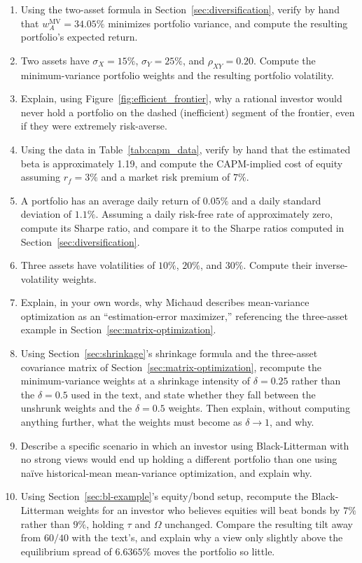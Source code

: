 \documentclass[../ai_in_finance]{subfiles}
\begin{document}
\begin{enumerate}[exercises]
    \item Using the two-asset formula in Section~\ref{sec:diversification}, verify by hand that $w_A^{\text{MV}} = 34.05\%$ minimizes portfolio variance, and compute the resulting portfolio's expected return.
    \item Two assets have $\sigma_X = 15\%$, $\sigma_Y = 25\%$, and $\rho_{XY} = 0.20$. Compute the minimum-variance portfolio weights and the resulting portfolio volatility.
    \item Explain, using Figure~\ref{fig:efficient_frontier}, why a rational investor would never hold a portfolio on the dashed (inefficient) segment of the frontier, even if they were extremely risk-averse.
    \item Using the data in Table~\ref{tab:capm_data}, verify by hand that the estimated beta is approximately 1.19, and compute the CAPM-implied cost of equity assuming $r_f=3\%$ and a market risk premium of $7\%$.
    \item A portfolio has an average daily return of $0.05\%$ and a daily standard deviation of $1.1\%$. Assuming a daily risk-free rate of approximately zero, compute its Sharpe ratio, and compare it to the Sharpe ratios computed in Section~\ref{sec:diversification}.
    \item Three assets have volatilities of $10\%$, $20\%$, and $30\%$. Compute their inverse-volatility weights.
    \item Explain, in your own words, why Michaud describes mean-variance optimization as an ``estimation-error maximizer,'' referencing the three-asset example in Section~\ref{sec:matrix-optimization}.
    \item Using Section~\ref{sec:shrinkage}'s shrinkage formula and the three-asset covariance matrix of Section~\ref{sec:matrix-optimization}, recompute the minimum-variance weights at a shrinkage intensity of $\delta = 0.25$ rather than the $\delta = 0.5$ used in the text, and state whether they fall between the unshrunk weights and the $\delta = 0.5$ weights. Then explain, without computing anything further, what the weights must become as $\delta \to 1$, and why.
    \item Describe a specific scenario in which an investor using Black-Litterman with no strong views would end up holding a different portfolio than one using na\"ive historical-mean mean-variance optimization, and explain why.
    \item Using Section~\ref{sec:bl-example}'s equity/bond setup, recompute the Black-Litterman weights for an investor who believes equities will beat bonds by $7\%$ rather than $9\%$, holding $\tau$ and $\Omega$ unchanged. Compare the resulting tilt away from $60/40$ with the text's, and explain why a view only slightly above the equilibrium spread of $6.6365\%$ moves the portfolio so little.

\end{enumerate}
\end{document}
